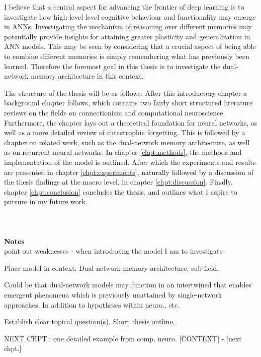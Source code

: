 I believe that a central aspect for advancing the frontier of deep learning is to investigate how high-level level cognitive behaviour and functionality may emerge in ANNs. Investigating the mechanism of reasoning over different memories may potentially provide insights for attaining greater plasticity and generalization in ANN models. This may be seen by considering that a crucial aspect of being able to combine different memories is simply remembering what has previously been learned. Therefore the foremost goal in this thesis is to investigate the dual-network memory architecture in this context.

The structure of the thesis will be as follows: After this introductory chapter a background chapter follows, which contains two fairly short structured literature reviews on the fields on connectionism and computational neuroscience. Furthermore, the chapter lays out a theoretical foundation for neural networks, as well as a more detailed review of catastrophic forgetting. This is followed by a chapter on related work, such as the dual-network memory architecture, as well as on recurrent neural networks. In chapter \ref{chpt:methods}, the methods and implementation of the model is outlined. After which the experiments and results are presented in chapter \ref{chpt:experiments}, naturally followed by a discussion of the thesis findings at the macro level, in chapter \ref{chpt:discussion}. Finally, chapter \ref{chpt:conclusion} concludes the thesis, and outlines what I aspire to pursure in my future work.
\\\\\\\\


\textbf{Notes}
\\

point out weaknesses - when introducing the model I am to investigate

Place model in context.
Dual-network memory architecture, sub-field.

Could be that dual-network models may function in an intertwined that enables emergent phenomena which is previously unattained by single-network approaches. In addition to hypotheses within neuro., etc.

Establish clear topical question(s).
Short thesis outline.


NEXT CHPT.:
one detailed example from comp. neuro. [CONTEXT] - [next chpt.]

\cleardoublepage